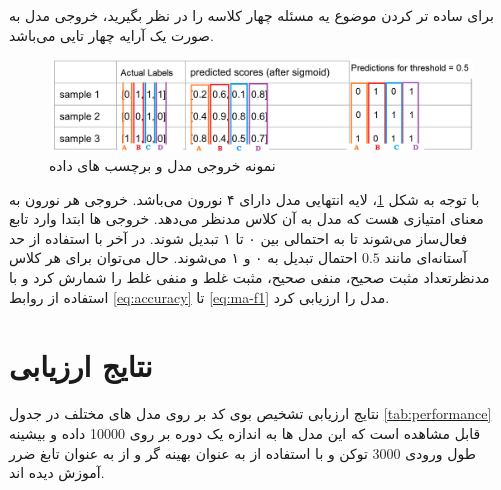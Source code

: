 برای ساده تر کردن موضوع یه مسئله چهار کلاسه را در نظر بگیرید، خروجی مدل به صورت یک آرایه چهار تایی می‌باشد.
\begin{figure}[H]
	\centering
	\includegraphics[width=1\textwidth]{figures/evaluate.png}
	\caption{نمونه خروجی مدل و برچسب های داده}
	\label{fig:evaluate}
\end{figure}
با توجه به شکل \ref{fig:evaluate}، لایه انتهایی مدل دارای ۴ نورون می‌باشد. خروجی هر نورون به معنای امتیازی  هست که مدل به آن کلاس مدنظر می‌دهد. خروجی ها ابتدا وارد تابع فعال‌ساز  می‌شوند تا به احتمالی بین ۰ تا ۱ تبدیل شوند. در آخر با استفاده از حد آستانه‌ای مانند $0.5$ احتمال تبدیل به ۰ و ۱ می‌شوند.
حال می‌توان برای هر کلاس مدنظرتعداد
مثبت صحیح،
منفی صحیح،
مثبت غلط
و منفی غلط
را شمارش کرد و با استفاده از روابط \ref{eq:accuracy} تا \ref{eq:ma-f1} مدل را ارزیابی کرد.\cite{BOGATINOVSKI2022117215}

\section{نتایج ارزیابی}

نتایج ارزیابی تشخیص بوی کد بر روی مدل های مختلف در جدول	\ref{tab:performance}
قابل مشاهده است که این مدل ها به اندازه یک دوره بر روی 10000 داده و بیشینه طول ورودی 3000 توکن و با استفاده از  به عنوان بهینه گر و از  به عنوان تابغ ضرر آموزش دیده اند.



\clearpage
